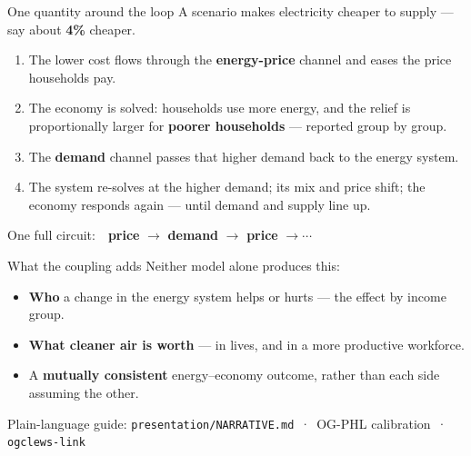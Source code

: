 \documentclass[aspectratio=169,11pt]{beamer}
\begin{document}
\begin{frame}{One quantity around the loop}
  A scenario makes electricity cheaper to supply — say about \textbf{4\%} cheaper.
  \medskip
  \begin{enumerate}\setlength\itemsep{5pt}
    \item The lower cost flows through the \textbf{energy-price} channel and eases the price households pay.
    \item The economy is solved: households use more energy, and the relief is proportionally larger for
          \textbf{poorer households} — reported group by group.
    \item The \textbf{demand} channel passes that higher demand back to the energy system.
    \item The system re-solves at the higher demand; its mix and price shift; the economy responds again
          — until demand and supply line up.
  \end{enumerate}
  \medskip
  {\footnotesize\color{mute}One full circuit:\ \ \textbf{\color{clews}price} $\rightarrow$
   \textbf{\color{ogc}demand} $\rightarrow$ \textbf{\color{clews}price} $\rightarrow \cdots$}
\end{frame}

\begin{frame}{What the coupling adds}
  Neither model alone produces this:
  \medskip
  \begin{itemize}\setlength\itemsep{7pt}
    \item \textbf{Who} a change in the energy system helps or hurts — the effect by income group.
    \item \textbf{What cleaner air is worth} — in lives, and in a more productive workforce.
    \item A \textbf{mutually consistent} energy--economy outcome, rather than each side assuming the other.
  \end{itemize}
  \vfill
  {\footnotesize\color{mute}Plain-language guide: \texttt{presentation/NARRATIVE.md}\, ·\, OG-PHL
   calibration\, ·\, \texttt{ogclews-link}}
\end{frame}
\end{document}
